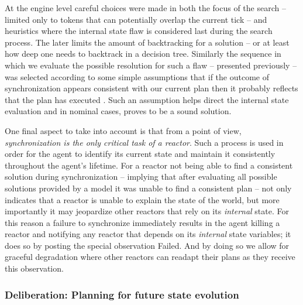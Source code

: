 At the engine level careful choices were made in both the focus of the
search -- limited only to tokens that can potentially overlap the
current tick -- and heuristics where the internal state flaw is
considered last during the search process. The later limits the amount
of backtracking for a solution -- or at least how deep one needs to
backtrack in a decision tree. Similarly the sequence in which we
evaluate the possible resolution for such a flaw -- presented
previously -- was selected according to some simple assumptions that %
if the outcome of synchronization appears consistent with our current
plan then it probably reflects that the plan has executed
. Such an assumption helps direct
the internal state evaluation and in nominal cases, proves to be a
sound solution.

One final aspect to take into account is that from a \rx point of
view, \emph{synchronization is the only critical task of a
  reactor}. Such a process is used in order for the agent to identify
its current state and maintain it consistently throughout the agent's
lifetime. For a reactor not being able to find a consistent solution
during synchronization -- implying that after evaluating all possible
solutions provided by a model it was unable to find a consistent plan
-- not only indicates that a reactor is unable to explain the state of
the world, but more importantly it may jeopardize other reactors that
rely on its {\em internal} state. For this reason a failure to
synchronize immediately results in the agent killing a reactor and
notifying any reactor that depends on its {\em internal} state
variables; it does so by posting the special observation
\textsf{Failed}. And by doing so we allow for graceful degradation
where other reactors can readapt their plans as they receive this
observation.

\subsubsection{Deliberation: Planning for future state evolution}
\label{sec:arch:plan}

